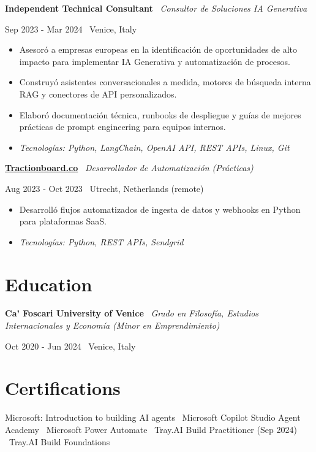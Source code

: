 \documentclass[a4paper,10pt]{article}
\newcommand{\role}[4]{%
  \vspace{2pt}\noindent
  \begin{minipage}[t]{0.70\textwidth}\raggedright\textbf{#1} \textbullet\ \textit{#3}\end{minipage}%
  \hfill
  \begin{minipage}[t]{0.28\textwidth}\raggedleft\footnotesize\color{gray}#2 \textbullet\ #4\end{minipage}%
  \vspace{1pt}%
}
\begin{document}
\role{Independent Technical Consultant}{Sep 2023 - Mar 2024}{Consultor de Soluciones IA Generativa}{Venice, Italy}
\begin{itemize}
  \item Asesoró a empresas europeas en la identificación de oportunidades de alto impacto para implementar IA Generativa y automatización de procesos.
  \item Construyó asistentes conversacionales a medida, motores de búsqueda interna RAG y conectores de API personalizados.
  \item Elaboró documentación técnica, runbooks de despliegue y guías de mejores prácticas de prompt engineering para equipos internos.
  \item \textit{Tecnologías: Python, LangChain, OpenAI API, REST APIs, Linux, Git}
\end{itemize}

\role{\href{https://tractionboard.co}{Tractionboard.co}}{Aug 2023 - Oct 2023}{Desarrollador de Automatización (Prácticas)}{Utrecht, Netherlands (remote)}
\begin{itemize}
  \item Desarrolló flujos automatizados de ingesta de datos y webhooks en Python para plataformas SaaS.
  \item \textit{Tecnologías: Python, REST APIs, Sendgrid}
\end{itemize}

\section{Education}
\role{Ca' Foscari University of Venice}{Oct 2020 - Jun 2024}{Grado en Filosofía, Estudios Internacionales y Economía (Minor en Emprendimiento)}{Venice, Italy}

\section{Certifications}
Microsoft: Introduction to building AI agents \textbullet\ Microsoft Copilot Studio Agent Academy \textbullet\ Microsoft Power Automate \textbullet\ Tray.AI Build Practitioner (Sep 2024) \textbullet\ Tray.AI Build Foundations

\end{document}
